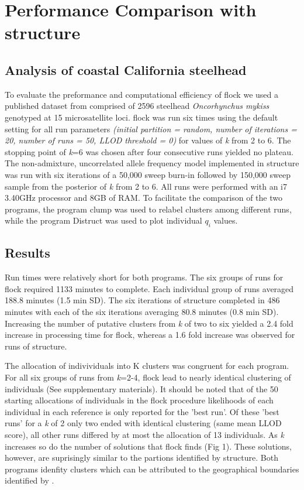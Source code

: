 \section*{Performance Comparison with {\sc structure}}

\subsection*{Analysis of coastal California steelhead} 
To evaluate the preformance and computational efficiency of {\sc flock}  we used a published 
dataset from \citet{Garzaetal_norcal} comprised of 2596 steelhead \textit{Oncorhynchus mykiss}
genotyped at 15 microsatellite loci.  {\sc flock} was run six times using the default setting for all 
run parameters \textit{(initial partition = random, number of iterations = 20, number of runs = 50, 
LLOD threshold = 0)} for values of \textit{k} from 2 to 6. The stopping point of 
\textit{k}=6 was chosen after four consecutive runs yielded no plateau. The non-admixture, 
uncorrelated allele frequency model implemented in {\sc structure} was run with six iterations of a 
50,000 sweep burn-in followed by 150,000 sweep sample from the posterior of \textit{k} from 2 to 6. 
All runs were performed with an i7 3.40GHz processor and 8GB of RAM. To facilitate the comparison of
 the two programs, the program {\sc clump} \citep{Jak&Ros2007} was used to relabel clusters among different runs,
while the program Distruct \citep{Rosenberg2004} was used to plot individual \textit{$q_i$} values. 

\subsection*{Results} 
Run times were relatively short for both programs. The six groups of runs for {\sc flock} 
required 1133 minutes to complete. Each individual group of runs 
averaged 188.8 minutes (1.5 min SD). The six iterations of {\sc structure} completed in 
486 minutes with each of the six iterations averaging 80.8 minutes (0.8 min SD). Increasing
the number of putative clusters from \textit{k} of two to six yielded a 2.4 fold increase 
in processing time for {\sc flock}, whereas a 1.6 fold increase was observed for runs of 
{\sc structure}. 

The allocation of indivividuals into K clusters was congruent for each program. For all six groups 
of runs from \textit{k}=2-4, {\sc flock} lead to nearly identical clustering of individuals 
(See supplementary materials). It should be noted
that of the 50 starting allocations of individuals in the {\sc flock} procedure likelihoods of each individual in 
each reference is only reported for the 
 'best run'. Of these 'best runs' for a \textit{k} of 2 only two  
ended with identical clustering (same mean LLOD score), all other runs 
differed by at most the allocation of 13 individuals. As \textit{k} increases so do the number of solutions
that {\sc flock} finds (Fig 1). These solutions, however, are suprisingly similar to
 the partions identified by {\sc structure}. Both programs idenfity clusters 
which can be attributed to the geographical boundaries identified by \citet{Garzaetal_norcal}.

